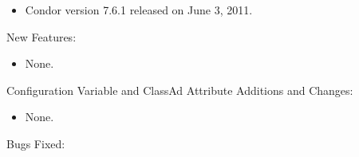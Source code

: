 \begin{itemize}

\item Condor version 7.6.1 released on June 3, 2011.

\end{itemize}


\noindent New Features:

\begin{itemize}

\item None.

\end{itemize}

\noindent Configuration Variable and ClassAd Attribute Additions and Changes:

\begin{itemize}

\item None.

\end{itemize}

\noindent Bugs Fixed:

